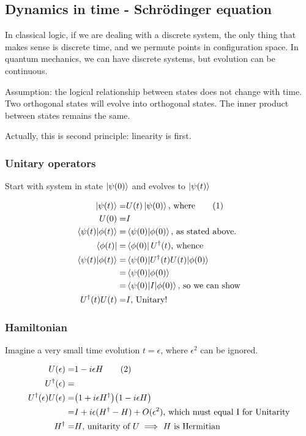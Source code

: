 \documentclass[]{article}
\newcommand\numberthis{\addtocounter{equation}{1}\tag{\theequation}}
\begin{document}
\subsection{Dynamics in time - Schr\"odinger equation}

In classical logic, if we are dealing with a discrete system, the only thing that makes sense is discrete time, and we permute points in configuration space. In quantum mechanics, we can have discrete systems, but evolution can be continuous.

Assumption: the logical relationship between states does not change with time. Two orthogonal states will evolve into orthogonal states. The inner product between states remains the same.

Actually, this is second principle: linearity is first.


\subsubsection{Unitary operators}\label{sect:unitary}

Start with system in state $\ket{\psi(0)}$ and evolves to $\ket{\psi(t)}$

\begin{align*}
	\ket{\psi(t)} =& U(t) \ket{\psi(0)} \text{, where} \numberthis \label{eq:evolution_time}\\
	U(0) =& I\\
	\braket{\psi(t)\vert\phi(t)} =& \braket{\psi(0)\vert\phi(0)} \text{, as stated above.}\\
	\bra{\phi(t)} =& \bra{\phi(0)} U^\dagger(t) \text{, whence}\\
	\braket{\psi(t)\vert\phi(t)} =& \braket{\psi(0)\vert U^\dagger(t) U(t)\vert\phi(0)}\\
	=& \braket{\psi(0)\vert\phi(0)} \\
	=& \braket{\psi(0)\vert I \vert \phi(0)} \text{, so we can show}\\
	 U^\dagger(t) U(t)=& I \text {, Unitary!}
\end{align*}

\subsubsection{Hamiltonian}

Imagine a very small time evolution $t=\epsilon$, where $\epsilon^2$ can be ignored.

\begin{align*}
	U(\epsilon) =& 1 - i \epsilon H \numberthis \label{eq:introducing:hamiltonian}\\
	U^\dagger (\epsilon) =& \\
	U^\dagger (\epsilon)U(\epsilon) =& \big(1 + i \epsilon H^\dagger\big)\big(1 - i \epsilon H\big)\\
	=& I + i\epsilon (H^\dagger-H) + O(\epsilon^2) \text{, which must equal I for Unitarity}\\
	H^\dagger=& H \text{, unitarity of $U\implies$ $H$ is Hermitian}
\end{align*}
\end{document}
